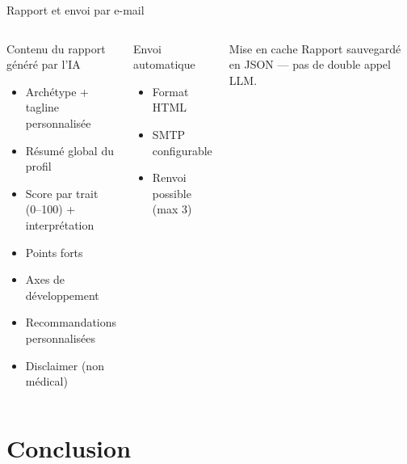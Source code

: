 \documentclass[aspectratio=169]{beamer}
\begin{document}
\begin{frame}{Rapport et envoi par e-mail}

  \begin{columns}[T]
    \begin{block}{Contenu du rapport généré par l'IA}
      \begin{itemize}
        \item Archétype + tagline personnalisée
        \item Résumé global du profil
        \item Score par trait (0--100) + interprétation
        \item Points forts
        \item Axes de développement
        \item Recommandations personnalisées
        \item Disclaimer (non médical)
      \end{itemize}
    \end{block}

    \begin{block}{Envoi automatique}
      \begin{itemize}
        \item Format HTML
        \item SMTP configurable
        \item Renvoi possible (max 3)
      \end{itemize}
    \end{block}

    \vspace{0.4em}
    \begin{alertblock}{Mise en cache}
      Rapport sauvegardé en JSON — pas de double appel LLM.
    \end{alertblock}
  \end{columns}

\end{frame}


\section{Conclusion}
\end{document}

